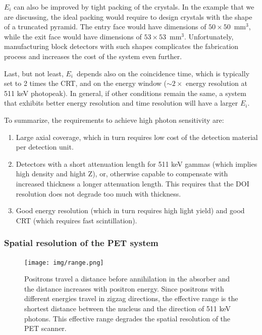 $E_i$ can also be improved by tight packing of the crystals. In the example that we are discussing, the ideal packing would require to design crystals with the shape of a truncated pyramid. The entry face would have dimensions of $50 \times 50$~mm$^3$, while the exit face would have dimensions of $53 \times 53$~mm$^3$. Unfortunately, manufacturing block detectors with such shapes complicates the fabrication process and increases the cost of the system even further. 

Last, but not least, $E_i$~depends also on the coincidence time, which is typically set to 2 times the CRT, and on the energy window ($\sim 2\times$ energy resolution at 511 keV photopeak). In general, if
other conditions remain the same, a system that exhibits better energy resolution and time
resolution will have a larger $E_i$.

To summarize, the requirements to achieve high photon sensitivity are:
\begin{enumerate}
\item Large axial coverage, which in turn requires low cost of the detection material per detection unit. 
\item Detectors with a short attenuation length for 511 keV gammas (which implies high density and hight Z), or, otherwise capable to compensate with increased thickness a longer attenuation length. This requires that the DOI resolution does not degrade too much with thickness. 
\item Good energy resolution (which in turn requires high light yield) and good CRT (which requires fast scintillation).
\end{enumerate}

\subsubsection*{Spatial resolution of the PET system}

\begin{figure}[!bthp]
	\centering
	\texttt{[image: img/range.png]}
	\caption{\label{fig.range} Positrons travel a distance before annihilation in the absorber and the distance increases with positron energy. Since positrons with different energies travel in zigzag directions, the effective range is the shortest distance between the nucleus and the direction of 511 keV photons. This effective range degrades the spatial resolution of the PET scanner.}
\end{figure}

